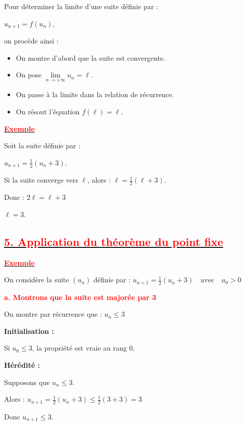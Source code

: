 \documentclass[12pt,a4paper]{article}
\begin{document}
Pour déterminer la limite d’une suite définie par :

\(
u_{n+1} = f(u_n),
\)

on procède ainsi :

\begin{itemize}
\item On montre d’abord que la suite est convergente.
\item On pose $\displaystyle \lim\limits_{n\to +\infty} u_n = \ell$.
\item On passe à la limite dans la relation de récurrence.
\item On résout l’équation $f(\ell) = \ell$.
\end{itemize}

\vspace{0.3cm}

\textbf{\underline{\textcolor{red}{ Exemple}}}

Soit la suite définie par :

\(
u_{n+1} = \frac{1}{2}(u_n + 3).
\)

Si la suite converge vers $\ell$, alors :
\(
\ell = \frac{1}{2}(\ell + 3).
\)

Donc :
\(
2\ell = \ell + 3
\)

\(
\ell = 3.
\)

\subsection*{\underline{\textbf{\textcolor{red}{5. Application du théorème du point fixe}}}}

\textbf{\underline{\textcolor{red}{ Exemple}}}

On considère la suite $(u_n)$ définie par :
\(
u_{n+1}=\frac{1}{2}(u_n+3)
\quad \text{avec} \quad u_0>0
\)

\bigskip

\textbf{\textcolor{red}{a. Montrons que la suite est majorée par 3}}

On montre par récurrence que :
\(
u_n \leq 3
\)

\textbf{Initialisation :}

Si $u_0 \leq 3$, la propriété est vraie au rang 0.

\textbf{Hérédité :}

Supposons que $u_n \leq 3$.

Alors :
\(
u_{n+1}=\frac{1}{2}(u_n+3)
\leq
\frac{1}{2}(3+3)
=
3
\)

Donc $u_{n+1} \leq 3$.
\end{document}

